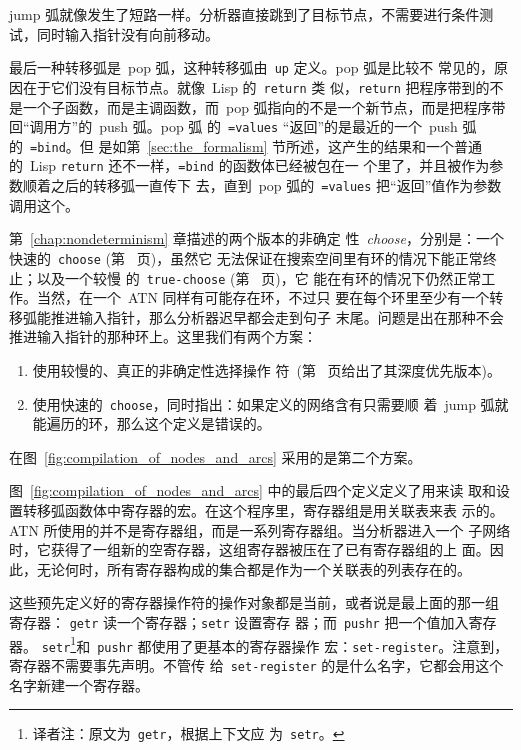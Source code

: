 jump 弧就像发生了短路一样。分析器直接跳到了目标节点，不需要进行条件测
试，同时输入指针没有向前移动。

最后一种转移弧是~pop 弧，这种转移弧由~\texttt{up} 定义。pop 弧是比较不
常见的，原因在于它们没有目标节点。就像~Lisp 的~\texttt{return} 类
似，\texttt{return} 把程序带到的不是一个子函数，而是主调函数，而~pop
弧指向的不是一个新节点，而是把程序带回``调用方''的~push 弧。pop 弧
的~\texttt{=values} ``返回''的是最近的一个~push 弧的~\texttt{=bind}。但
是如第~\ref{sec:the_formalism} 节所述，这产生的结果和一个普通的~Lisp
\texttt{return} 还不一样，\texttt{=bind} 的函数体已经被包在一
个\continuation{}里了，并且被作为参数顺着之后的转移弧一直传下
去，直到~pop 弧的~\texttt{=values} 把``返回''值作为参数调用这个\continuation{}。

第~\ref{chap:nondeterminism} 章描述的两个版本的非确定
性~\emph{choose}，分别是：一个快速的~\texttt{choose}
(第~\pageref{fig:scheme_implementation_of_choose_and_fail} 页)，虽然它
无法保证在搜索空间里有环的情况下能正常终止；以及一个较慢
的~\texttt{true-choose} (第~\pageref{fig:correct_choose_in_scheme} 页)，它
能在有环的情况下仍然正常工作。当然，在一个~\textsc{ATN} 同样有可能存在环，不过只
要在每个环里至少有一个转移弧能推进输入指针，那么分析器迟早都会走到句子
末尾。问题是出在那种不会推进输入指针的那种环上。这里我们有两个方案：
\begin{enumerate}
\item 使用较慢的、真正的非确定性选择操作
  符~(第~\pageref{func:true-choice} 页给出了其深度优先版本)。
\item 使用快速的~\texttt{choose}，同时指出：如果定义的网络含有只需要顺
  着~jump 弧就能遍历的环，那么这个定义是错误的。
\end{enumerate}
在图~\ref{fig:compilation_of_nodes_and_arcs} 采用的是第二个方案。

图~\ref{fig:compilation_of_nodes_and_arcs} 中的最后四个定义定义了用来读
取和设置转移弧函数体中寄存器的宏。在这个程序里，寄存器组是用关联表来表
示的。\textsc{ATN} 所使用的并不是寄存器组，而是一系列寄存器组。当分析器进入一个
子网络时，它获得了一组新的空寄存器，这组寄存器被压在了已有寄存器组的上
面。因此，无论何时，所有寄存器构成的集合都是作为一个关联表的列表存在的。

这些预先定义好的寄存器操作符的操作对象都是当前，或者说是最上面的那一组
寄存器： \texttt{getr} 读一个寄存器；\texttt{setr} 设置寄存
器；而~\texttt{pushr} 把一个值加入寄存器。
\texttt{setr}\footnote{译者注：原文为~\texttt{getr}，根据上下文应
为~\texttt{setr}。}和~\texttt{pushr} 都使用了更基本的寄存器操作
宏：\texttt{set-register}。注意到，寄存器不需要事先声明。不管传
给~\texttt{set-register} 的是什么名字，它都会用这个名字新建一个寄存器。

